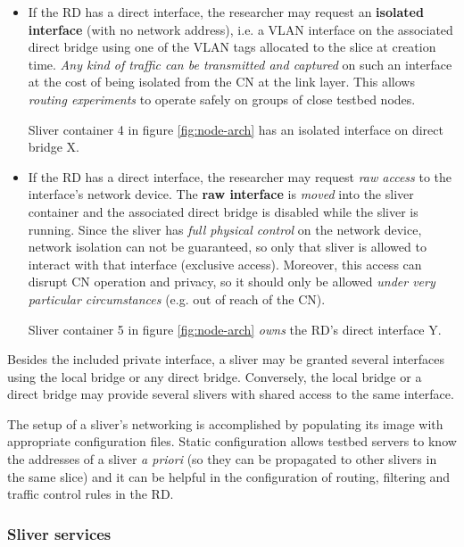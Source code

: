 \documentclass[conference]{IEEEtran}
\begin{document}
\begin{itemize}

\item If the RD has a direct interface, the researcher may request an
  \textbf{isolated interface} (with no network address), i.e. a VLAN interface on the
  associated direct bridge using one of the VLAN tags allocated to the slice
  at creation time.  \emph{Any kind of traffic can be transmitted and
    captured} on such an interface at the cost of being isolated from the CN
  at the link layer.  This allows \emph{routing experiments} to operate safely
  on groups of close testbed nodes.

  Sliver container 4 in figure \ref{fig:node-arch} has an isolated interface
  on direct bridge X.

\item If the RD has a direct interface, the researcher may request \emph{raw
  access} to the interface's network device.  The \textbf{raw interface} is
  \emph{moved} into the sliver container and the associated direct bridge is
  disabled while the sliver is running.  Since the sliver has \emph{full
    physical control} on the network device, network isolation can not be
  guaranteed, so only that sliver is allowed to interact with that interface (exclusive access).  Moreover, this
  access can disrupt CN operation and privacy, so it should only be allowed
  \emph{under very particular circumstances} (e.g. out of reach of the CN).

  Sliver container 5 in figure \ref{fig:node-arch} \emph{owns} the RD's direct
  interface Y.

\end{itemize}

Besides the included private interface, a sliver may be granted several
interfaces using the local bridge or any direct bridge.  Conversely, the local
bridge or a direct bridge may provide several slivers with shared access to
the same interface.

The setup of a sliver's networking is accomplished by populating its image
with appropriate configuration files.  Static configuration allows testbed
servers to know the addresses of a sliver \emph{a priori} (so they can be
propagated to other slivers in the same slice) and it can be helpful in the
configuration of routing, filtering and traffic control rules in the RD.

\subsubsection{Sliver services}
\label{sec:sliver-services}
\end{document}
